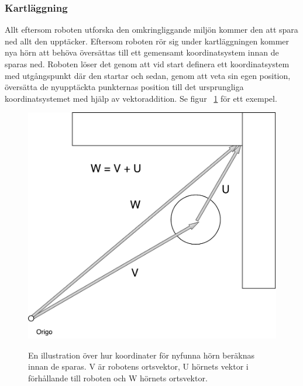 \documentclass{article}
\begin{document}
\subsubsection{Kartläggning}

Allt eftersom roboten utforska den omkringliggande miljön kommer den att spara ned allt den upptäcker. Eftersom roboten rör sig under kartläggningen kommer nya hörn att behöva översättas till ett gemensamt koordinatsystem innan de sparas ned. Roboten löser det genom att vid start definera ett koordinatsystem med utgångspunkt där den startar och sedan, genom att veta sin egen position, översätta de nyupptäckta punkternas position till det ursprungliga koordinatsystemet med hjälp av vektoraddition. Se figur ~\ref{fig:Koordinatberakning} för ett exempel.\newline\newline

\begin{figure}[H]
  \centering
  \includegraphics[scale=0.5]{Koordinatberakning} \\
  \caption{En illustration över hur koordinater för nyfunna hörn beräknas innan de sparas. V är robotens ortsvektor, U hörnets vektor i förhållande till roboten och W hörnets ortsvektor.}
  \label{fig:Koordinatberakning}
\end{figure}
\end{document}

